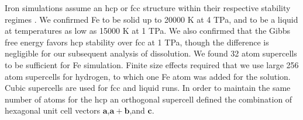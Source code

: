 Iron simulations assume an hcp or fcc structure within their respective
stability regimes \citep{Pickard2009,stixrude2012}. We confirmed Fe to be solid up
to 20000 K at 4 TPa, and to be a liquid at temperatures as low as 15000 K at
1 TPa. We also confirmed that the Gibbs free energy favors hcp stability over fcc
at 1 TPa, though the difference is negligible for our subsequent analysis of
dissolution. We found 32 atom supercells to be sufficient for Fe simulation.
Finite size effects required that we use large 256 atom supercells for
hydrogen, to which one Fe atom was added for the solution. Cubic
supercells are used for fcc and liquid runs. In order to maintain the same
number of atoms for the hcp an orthogonal supercell defined the combination of
hexagonal unit cell vectors $\mathbf{a}$,$\mathbf{a}+\mathbf{b}$,and
$\mathbf{c}$.


